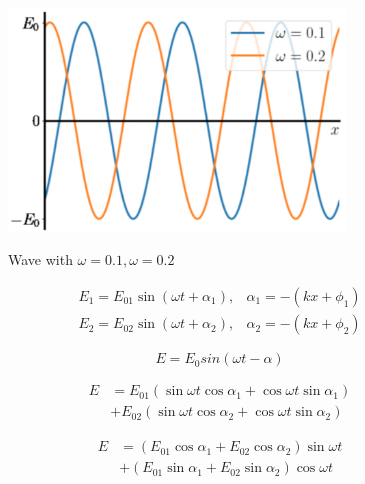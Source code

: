 \begin{figure}[H]
   \centering
    \includegraphics[width=0.8\textwidth]{lesson6/w.pdf}
    \label{fig: 1}
    \begin{center}
        \caption{Wave with $\omega = 0.1, \omega = 0.2$}
    \end{center}
\end{figure}

\begin{equation}
\begin{array}{ll}
E_{1}=E_{01} \sin \left(\omega t+\alpha_{1}\right), & \alpha_{1}=-\left(k x+\phi_{1}\right) \\
E_{2}=E_{02} \sin \left(\omega t+\alpha_{2}\right), & \alpha_{2}=-\left(k x+\phi_{2}\right)
\end{array}
\end{equation}

\begin{equation}
E = E_0 sin(\omega t - \alpha)
\end{equation}

\begin{equation}
\begin{aligned}
E &=E_{01}\left(\sin \omega t \cos \alpha_{1}+\cos \omega t \sin \alpha_{1}\right) \\
&+E_{02}\left(\sin \omega t \cos \alpha_{2}+\cos \omega t \sin \alpha_{2}\right)
\end{aligned}
\end{equation}

\begin{equation}
\begin{aligned}
E &=\left(E_{01} \cos \alpha_{1}+E_{02} \cos \alpha_{2}\right) \sin \omega t \\
&+\left(E_{01} \sin \alpha_{1}+E_{02} \sin \alpha_{2}\right) \cos \omega t
\end{aligned}
\end{equation}

